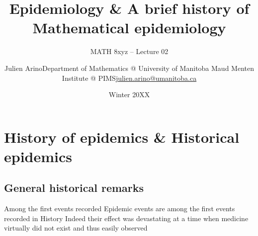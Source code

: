\documentclass[aspectratio=169]{beamer}\usepackage[]{graphicx}\usepackage[]{xcolor}
\title{Epidemiology \& A brief history of Mathematical epidemiology}
\subtitle{MATH 8xyz -- Lecture 02}
\author{\texorpdfstring{Julien Arino\newline Department of Mathematics @ University of Manitoba \newline Maud Menten Institute @ PIMS\newline\url{julien.arino@umanitoba.ca}}{Julien Arino}}
\date{Winter 20XX}
\begin{document}


\section{History of epidemics \& Historical epidemics}

\subsection{General historical remarks}
\begin{frame}{Among the first events recorded}
\bbullet Epidemic events are among the first events recorded in History
\vfill
\bbullet Indeed their effect was devastating at a time when medicine virtually did not exist and thus easily observed
\end{frame}
\end{document}
